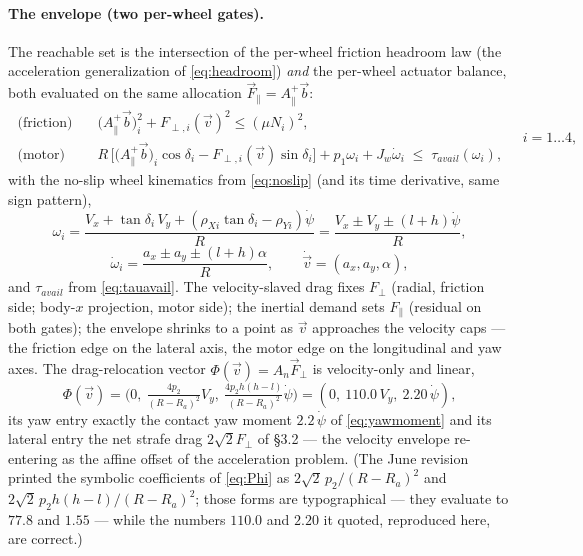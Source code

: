 \documentclass[11pt]{article}
\begin{document}
\paragraph{The envelope (two per-wheel gates).} The reachable set is the intersection of the
per-wheel friction headroom law (the acceleration generalization of \eqref{eq:headroom})
\emph{and} the per-wheel actuator balance, both evaluated on the same allocation
$\vec F_\parallel=A_\parallel^{+}\vec b$:
\begin{equation}
\boxed{\;
\begin{aligned}
\text{(friction)}\quad & \big(A_\parallel^{+}\vec b\big)_i^2+F_{\perp,i}(\vec v)^2\le(\mu N_i)^2,\\[2pt]
\text{(motor)}\quad & R\,\Big[\big(A_\parallel^{+}\vec b\big)_i\cos\delta_i-F_{\perp,i}(\vec v)\sin\delta_i\Big]
+p_1\omega_i+J_w\dot\omega_i\;\le\;\tau_{avail}(\omega_i),
\end{aligned}\quad i=1\ldots4,\;}
\label{eq:master}
\end{equation}
with the no-slip wheel kinematics from \eqref{eq:noslip} (and its time derivative, same sign
pattern),
\begin{equation}
\omega_i=\frac{V_x+\tan\delta_i\,V_y+(\rho_{Xi}\tan\delta_i-\rho_{Yi})\dot\psi}{R}
=\frac{V_x\pm V_y\pm(l+h)\dot\psi}{R},
\label{eq:wheelmap}
\end{equation}
\begin{equation}
\dot\omega_i=\frac{a_x\pm a_y\pm(l+h)\alpha}{R},
\qquad \dot{\vec v}=(a_x,a_y,\alpha),
\label{eq:wheelaccmap}
\end{equation}
and $\tau_{avail}$ from \eqref{eq:tauavail}. The velocity-slaved drag fixes $F_\perp$ (radial,
friction side; body-$x$ projection, motor side); the inertial demand sets $F_\parallel$
(residual on both gates); the envelope shrinks to a point as $\vec v$ approaches the velocity
caps --- the friction edge on the lateral axis, the motor edge on the longitudinal and yaw axes.
The drag-relocation vector $\Phi(\vec v)=A_n\vec F_\perp$ is velocity-only and linear,
\begin{equation}
\Phi(\vec v)=\Big(0,\ \tfrac{4p_2}{(R-R_a)^2}V_y,\ \tfrac{4p_2h(h-l)}{(R-R_a)^2}\dot\psi\Big)
=(0,\ 110.0\,V_y,\ 2.20\,\dot\psi),
\label{eq:Phi}
\end{equation}
its yaw entry exactly the contact yaw moment $2.2\,\dot\psi$ of \eqref{eq:yawmoment} and its lateral
entry the net strafe drag $2\sqrt2 F_\perp$ of \S3.2 --- the velocity envelope re-entering as the
affine offset of the acceleration problem. (The June revision printed the symbolic coefficients of
\eqref{eq:Phi} as $2\sqrt2\,p_2/(R-R_a)^2$ and $2\sqrt2\,p_2h(h-l)/(R-R_a)^2$; those forms are
typographical --- they evaluate to $77.8$ and $1.55$ --- while the numbers $110.0$ and $2.20$ it
quoted, reproduced here, are correct.)
\end{document}

